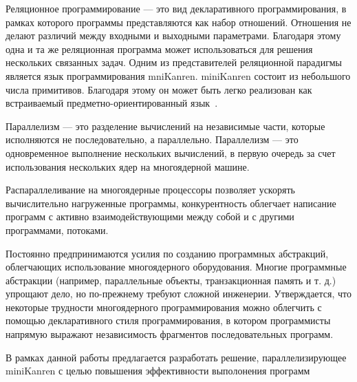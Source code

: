 

Реляционное программирование --- это вид декларативного программирования, в рамках которого программы представляются как набор
отношений. Отношения не делают различий между входными и выходными параметрами. Благодаря этому одна и та же реляционная
программа может использоваться для решения нескольких связанных
задач. Одним из представителей реляционной парадигмы является
язык программирования mniKanren. miniKanren состоит из небольшого числа примитивов. Благодаря этому он может быть легко реализован как встраиваемый предметно-ориентированный язык~\cite{moiseenko_podkopaev}. 


Параллелизм --- это разделение вычислений на независимые части, которые исполняются не последовательно, а параллельно. 
Параллелизм --- это одновременное выполнение нескольких вычислений, в первую очередь за счет использования нескольких ядер на многоядерной машине.  

Распараллеливание на многоядерные процессоры позволяет ускорять вычислительно нагруженные программы, конкурентность облегчает написание программ с активно взаимодействующими между собой и с другими программами, потоками.

Постоянно предпринимаются усилия по созданию программных
абстракций, облегчающих использование многоядерного оборудования.
Многие программные абстракции (например, параллельные объекты, 
транзакционная память и т. д.) упрощают дело, но по-прежнему 
требуют сложной инженерии. Утверждается, что некоторые трудности 
многоядерного программирования можно облегчить с помощью 
декларативного стиля программирования, в котором 
программисты напрямую выражают независимость фрагментов 
последовательных программ.

В рамках данной работы предлагается разработать решение,
параллелизирующее miniKanren с целью повышения 
эффективности выполонения программ

